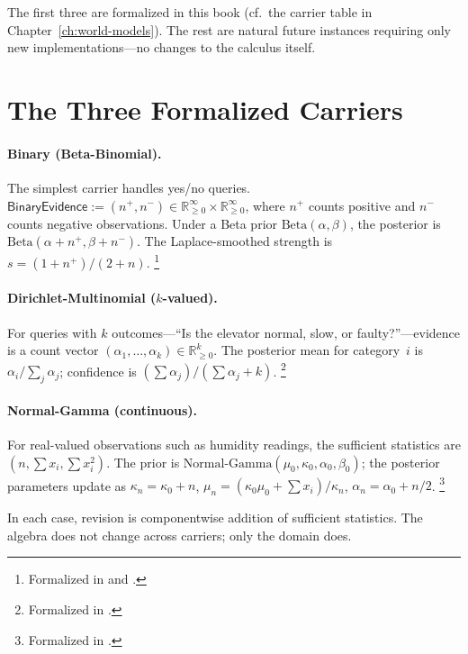 \documentclass[11pt,openany]{report}
\begin{document}
\noindent
The first three are formalized in this book
(cf.\ the carrier table in Chapter~\ref{ch:world-models}).  The rest
are natural future instances requiring only new 
implementations---no changes to the calculus itself.


\section{The Three Formalized Carriers}

\paragraph{Binary (Beta-Binomial).}
The simplest carrier handles yes/no queries.
$\mathsf{BinaryEvidence} := (n^+, n^-) \in
\mathbb{R}_{\ge 0}^\infty \times \mathbb{R}_{\ge 0}^\infty$,
where $n^+$ counts positive and $n^-$ counts negative observations.
Under a Beta prior $\text{Beta}(\alpha, \beta)$, the posterior is
$\text{Beta}(\alpha + n^+, \beta + n^-)$.  The Laplace-smoothed
strength is $s = (1 + n^+) / (2 + n)$.%
\footnote{Formalized in 
and .}

\paragraph{Dirichlet-Multinomial ($k$-valued).}
For queries with $k$ outcomes---``Is the elevator normal, slow, or
faulty?''---evidence is a count vector
$(\alpha_1, \ldots, \alpha_k) \in \mathbb{R}_{\ge 0}^k$.
The posterior mean for category~$i$ is
$\alpha_i / \sum_j \alpha_j$; confidence is
$(\sum \alpha_j) / (\sum \alpha_j + k)$.%
\footnote{Formalized in .}

\paragraph{Normal-Gamma (continuous).}
For real-valued observations such as humidity readings, the sufficient
statistics are $(n, \sum x_i, \sum x_i^2)$.  The prior is
$\text{Normal-Gamma}(\mu_0, \kappa_0, \alpha_0, \beta_0)$; the
posterior parameters update as
$\kappa_n = \kappa_0 + n$,
$\mu_n = (\kappa_0 \mu_0 + \sum x_i) / \kappa_n$,
$\alpha_n = \alpha_0 + n/2$.%
\footnote{Formalized in .}

\medskip\noindent
In each case, revision is componentwise addition of sufficient
statistics.  The algebra does not change across carriers; only the
domain does.
\end{document}
